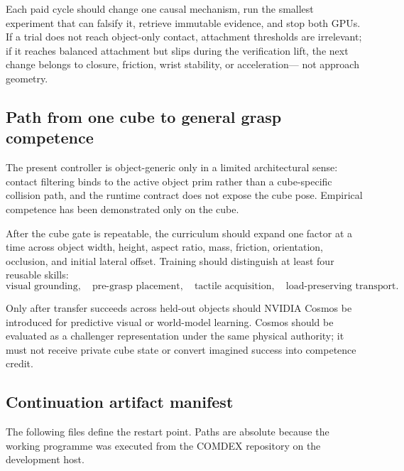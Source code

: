 Each paid cycle should change one causal mechanism, run the smallest experiment
that can falsify it, retrieve immutable evidence, and stop both GPUs.  If a
trial does not reach object-only contact, attachment thresholds are irrelevant;
if it reaches balanced attachment but slips during the verification lift, the
next change belongs to closure, friction, wrist stability, or acceleration---
not approach geometry.

\subsection{Path from one cube to general grasp competence}

The present controller is object-generic only in a limited architectural
sense: contact filtering binds to the active object prim rather than a
cube-specific collision path, and the runtime contract does not expose the
cube pose.  Empirical competence has been demonstrated only on the cube.

After the cube gate is repeatable, the curriculum should expand one factor at a
time across object width, height, aspect ratio, mass, friction, orientation,
occlusion, and initial lateral offset.  Training should distinguish at least
four reusable skills:
\begin{equation}
\text{visual grounding},\quad
\text{pre-grasp placement},\quad
\text{tactile acquisition},\quad
\text{load-preserving transport}.
\end{equation}

Only after transfer succeeds across held-out objects should NVIDIA Cosmos be
introduced for predictive visual or world-model learning.  Cosmos should be
evaluated as a challenger representation under the same physical authority;
it must not receive private cube state or convert imagined success into
competence credit.

\subsection{Continuation artifact manifest}

The following files define the restart point.  Paths are absolute because the
working programme was executed from the COMDEX repository on the development
host.


